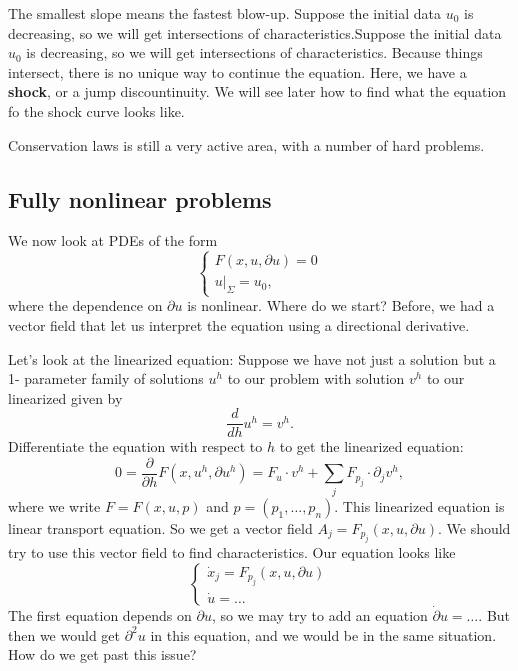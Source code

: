 \begin{example}
    The smallest slope means the fastest blow-up. Suppose the initial data $u_0$ is decreasing, so we will get intersections of characteristics.Suppose the initial data $u_0$ is decreasing, so we will get intersections of characteristics.   Because things intersect, there is no unique way to continue the equation. Here, we have a \textbf{shock}, or a jump discountinuity. We will see later how to find what the equation fo the shock curve looks like. 

    Conservation laws is still a very active area, with a number of hard problems.

\end{example}

\subsection{Fully nonlinear problems}

We now look at PDEs of the form 
\[
    \begin{cases}
        F(x,u,\partial u) = 0\\ 
        u|_{\Sigma}= u_0,
    \end{cases}
\]
where the dependence on $\partial u$ is nonlinear.  Where do we start? Before, we had a vector
field that let us interpret the equation using a directional derivative.

Let’s look at the linearized equation: Suppose we have not just a solution but a 1-
parameter family of solutions $u^h$ to our problem with solution $v^h$ to our linearized given by
\[
    \frac d {dh} u^h = v^h.
\]
Differentiate the equation with respect to $h$ to get the linearized equation: 
\[
    0=\frac{\partial}{\partial h} F\left(x, u^{h}, \partial u^{h}\right)=F_{u} \cdot v^{h}+\sum_j F_{p_{j}} \cdot \partial_{j} v^{h},
\]
where we write $F=F(x,u,p)$ and $p=(p_1,\dots, p_n)$.
This linearized equation is linear transport equation. So we get a vector field $A_j = F_{p_j}(x,u, \partial u)$. We should try to use this vector field to find characteristics. Our equation looks like 
\[
\begin{cases}
    \dot x_j = F_{p_j}(x,u, \partial u)\\
    \dot u = \dots
\end{cases}
\]
The first equation depends on $\partial u$, so we may try to add an equation $\dot \partial u = \dots$. But then we  would get $\partial^2 u$ in this equation, and we would be in the same situation. How do we get past this issue?

